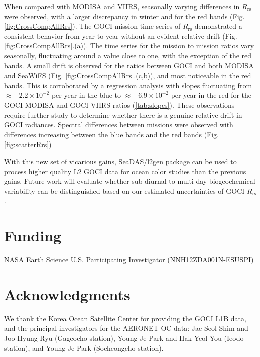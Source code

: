 \documentclass[]{interact}
\theoremstyle{plain}%
\theoremstyle{definition}
\theoremstyle{remark}
\begin{document}

When compared with MODISA and VIIRS, seasonally varying differences in $R_\text{rs}$ were observed, with a larger discrepancy in winter and for the red bands (Fig. \ref{fig:CrossCompAllRrs}). The GOCI mission time series of $R_\text{rs}$ demonstrated a consistent behavior from year to year without an evident relative drift (Fig. \ref{fig:CrossCompAllRrs}.(a)). The time series for the mission to mission ratios vary seasonally, fluctuating around a value close to one, with the exception of the red bands. A small drift is observed for the ratios between GOCI and both MODISA and SeaWiFS (Fig. \ref{fig:CrossCompAllRrs}.(c,b)), and most noticeable in the red bands. This is corroborated by a regression analysis with slopes fluctuating from $\approx-2.2\times10^{-2}$ per year in the blue to $\approx-6.9\times10^{-2}$ per year in the red for the GOCI-MODISA and GOCI-VIIRS ratios (\autoref{tab:slopes}). These observations require further study to determine whether there is a genuine relative drift in GOCI radiances. Spectral differences between missions were observed with differences increasing between the blue bands and the red bands (Fig. \ref{fig:scatterRrs})

 
With this new set of vicarious gains, SeaDAS/l2gen package can be used to process higher quality L2 GOCI data for ocean color studies than the previous gains. Future work will evaluate whether sub-diurnal to multi-day biogeochemical variability can be distinguished based on our estimated uncertainties of GOCI $R_\text{rs}$. 

\section*{Funding}
NASA Earth Science U.S. Participating Investigator (NNH12ZDA001N-ESUSPI) 
\section*{Acknowledgments}
We thank the Korea Ocean Satellite Center for providing the GOCI L1B data, and the principal investigators for the AERONET-OC data: Jae-Seol Shim and Joo-Hyung Ryu (Gageocho station), Young-Je Park and Hak-Yeol You (Ieodo station), and Young-Je Park (Socheongcho station). 


\end{document}
